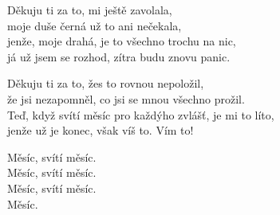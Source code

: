 
\ve{}
Děkuju ti za to,  mi ještě zavolala,  \quad {}\\
moje duše černá už to ani nečekala,  \quad {}\\
jenže, moje drahá, je to všechno trochu na nic,  \quad {}\\
já už jsem se rozhod, zítra budu znovu panic.  \quad {}

\ve{}
Děkuju ti za to, žes to rovnou nepoložil,\\
že jsi nezapomněl, co jsi se mnou všechno prožil.\\
Teď, když svítí měsíc pro každýho zvlášť, je mi to líto,\\
jenže už je konec, však víš to. Vím to!

\re{}
Měsíc,  svítí měsíc.  \quad {}\\
Měsíc,  svítí měsíc.  \quad {}\\
Měsíc,  svítí měsíc.  \quad {}\\
Měsíc. 

\esong{}